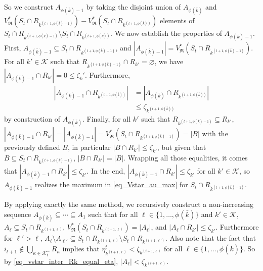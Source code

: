 \documentclass[
  11pt,
  a4paper,
]{article}
\theoremstyle{plain}
\theoremstyle{definition}
\theoremstyle{plain}
\theoremstyle{definition}
\theoremstyle{plain}
\theoremstyle{remark}
\begin{document}
So we construct \(A_{\phi(\bar k)-1}\) by taking the disjoint union of
\(A_{\phi(\bar k)}\) and
\(V^*_{\mathfrak{R}}(S_t \cap R_{k^{(t+1,\phi(\bar k)-1)}}) - V^*_{\mathfrak{R}}(S_t \cap R_{k^{(t+1,\phi(\bar k))}})\)
elements of
\(S_t\cap R_{k^{(t+1,\phi(\bar k)-1)}} \setminus S_t\cap R_{k^{(t+1,\phi(\bar k))}}\).
We now establish the properties of \(A_{\phi(\bar k)-1}\). First,
\(A_{\phi(\bar k)-1}\subseteq S_t \cap R_{k^{(t+1,\phi(\bar k)-1)}}\),
and
\(|A_{\phi(\bar k)-1}|=V^*_{\mathfrak{R}}(S_t \cap R_{k^{(t+1,\phi(\bar k)-1)}})\).
For all \(k'\in\mathcal{K}\) such that
\(R_{k^{(t+1,\phi(\bar k)-1)}} \cap R_{k'}=\varnothing\), we have
\(|A_{\phi(\bar k)-1}\cap R_{k'}|=0\leq \zeta_k'\). Furthermore,
\begin{align*}
|A_{\phi(\bar k)-1}\cap R_{   k^{(t+1,\phi(\bar k))}   }|&=|A_{\phi(\bar k)}\cap R_{   k^{(t+1,\phi(\bar k))}   }|\\
&\leq \zeta_{ k^{(t+1,\phi(\bar k))} }
\end{align*} by construction of \(A_{\phi(\bar k)}\). Finally, for all
\(k'\) such that \(R_{k^{(t+1,\phi(\bar k)-1)}}\subseteq R_{k'}\),
\(|A_{\phi(\bar k)-1}\cap R_{k'}|=|A_{\phi(\bar k)-1}|=V^*_{\mathfrak{R}}(S_t \cap R_{k^{(t+1,\phi(\bar k)-1)}})=|B|\)
with the previously defined \(B\), in particular
\(|B\cap R_{k'}|\leq \zeta_{k'}\), but given that
\(B\subseteq S_t \cap R_{k^{(t+1,\phi(\bar k)-1)}}\),
\(|B\cap R_{k'}|=|B|\). Wrapping all those equalities, it comes that
\(|A_{\phi(\bar k)-1}\cap R_{k'}|\leq \zeta_{k'}\). In the end,
\(|A_{\phi(\bar k)-1}\cap R_{k'}|\leq \zeta_{k'}\) for all
\(k'\in\mathcal{K}\), so \(A_{\phi(\bar k)-1}\) realizes the maximum in
\eqref{eq_Vstar_au_max} for \(S_t \cap R_{k^{(t+1,\phi(\bar k)-1)}}\).

By applying exactly the same method, we recursively construct a
non-increasing sequence \(A_{\phi(\bar k)}\subseteq\dotsb\subseteq A_1\)
such that for all \(\ell\in\{1,\dotsc, \phi(\bar k)\}\) and
\(k'\in\mathcal{K}\), \(A_\ell\subseteq S_t\cap R_{k^{(t+1,\ell)}}\),
\(V^*_{\mathfrak{R}}(S_t\cap R_{k^{(t+1,\ell)}})=|A_\ell|\), and
\(|A_\ell\cap R_{k'}|\leq \zeta_{k'}\). Furthermore for \(\ell'>\ell\),
\(A_{\ell}\setminus A_{\ell'}\subseteq S_t\cap R_{k^{(t+1,\ell)}}\setminus S_t\cap R_{k^{(t+1,\ell')}}\).
Also note that the fact that
\(i_{t+1}\not\in\bigcup_{\kappa\in\mathcal{K}^-_{t}}R_{\kappa}\) implies
that \(\eta^t_{k^{(t+1,\ell)}}<\zeta_{k^{(t+1,\ell)}}\) for all
\(\ell\in\{1,\dotsc, \phi(\bar k)\}\). So by
\eqref{eq_vstar_inter_Rk_equal_eta},
\(|A_\ell|<\zeta_{k^{(t+1,\ell)}}\).
\end{document}

